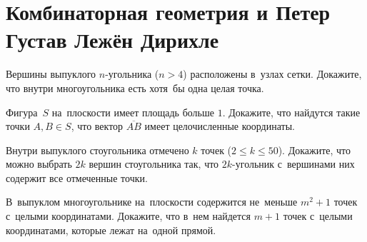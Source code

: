 
\section*{Комбинаторная геометрия и Петер Густав Лежён Дирихле}

\begin{problems}

\item
Вершины выпуклого $n$-угольника ($n > 4$) расположены в~узлах сетки.
Докажите, что внутри многоугольника есть хотя~бы одна целая точка.

\item
Фигура~$S$ на~плоскости имеет площадь больше $1$.
Докажите, что найдутся такие точки $A, B \in S$, что вектор $\overline{AB}$
имеет целочисленные координаты.

\item
Внутри выпуклого стоугольника отмечено $k$ точек ($2 \leq k \leq 50$).
Докажите, что можно выбрать $2k$ вершин стоугольника так, что $2k$-угольник
с~вершинами них содержит все отмеченные точки.

\item
В~выпуклом многоугольнике на~плоскости содержится не~меньше $m^2 + 1$ точек
с~целыми координатами.
Докажите, что в~нем найдется $m + 1$ точек с~целыми координатами, которые лежат
на~одной прямой.

\end{problems}

\iffalse %

\item
Есть несколько векторов на~плоскости с~суммой ноль.
Докажите, что их~можно расположить по~сторонам выпуклого многоугольника.

\fi %

